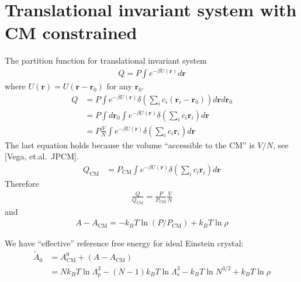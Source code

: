\documentclass[aps,pre,a4paper,showkeys,fleqn]{revtex4}
\newcommand{\com}[0]{{\textrm{CM}}}
\begin{document}
\section{Translational invariant system with CM constrained}
The partition function for translational invariant system
\begin{align*}
  Q = P \int e^{-\beta U(\bm r)}d \bm r
\end{align*}
where $U(\bm r) = U(\bm r - \bm r_0)$ for any $\bm r_0$.
\begin{align*}
  Q
  &=
    P \int e^{-\beta U(\bm r)} \delta(\sum_i c_i (\bm r_i - \bm r_0)) d\bm r d\bm r_0 \\
  &=
    P\int d\bm r_0 \int e^{-\beta U(\bm r)} \delta(\sum_i c_i \bm r_i) d\bm r\\
  &=
    P\frac{V}{N} \int e^{-\beta U(\bm r)} \delta(\sum_i c_i \bm r_i) d\bm r
\end{align*}
The last equation holds because the volume ``accessible to the CM'' is $V/N$, see [Vega, et.al.~JPCM].
\begin{align*}
  Q_\com
  &=
    P_\com\int e^{-\beta U(\bm r)} \delta(\sum_i c_i \bm r_i) d\bm r
\end{align*}
Therefore
\begin{align*}
  \frac{Q}{Q_\com} = \frac{P}{P_\com}\frac{V}{N}
\end{align*}
and
\begin{align}
  A - A_\com = -k_BT\ln(P / P_\com) + k_BT\ln \rho
\end{align}

We have ``effective'' reference free energy for ideal Einstein crystal:
\begin{align} \nonumber
  \tilde A_0
  &=
    A^0_\com + (A - A_\com) \\
  &=
    Nk_BT\ln \Lambda_p^3 - (N-1)k_BT\ln\Lambda_s^3 - k_BT\ln N^{3/2} + k_BT\ln \rho
\end{align}
\end{document}

